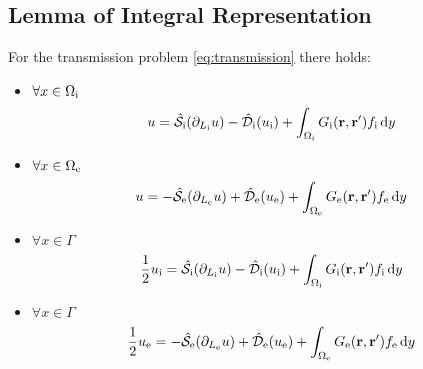 \subsection{Lemma of Integral Representation}
For the transmission problem \ref{eq:transmission} there holds:
\begin{itemize}
\item $\forall x \in \Omegai$
\begin{equation}
u = \bi{S}_\mathrm{i}(\partiali u)
- \bi{D}_\mathrm{i}(\ui) + \int_{\Omegai} \Gi f_\mathrm{i}\diff y
\end{equation}
\item $\forall x \in \Omegae$
\begin{equation}
u = -\bi{S}_\mathrm{e}(\partiale u)
+ \bi{D}_\mathrm{e}(\ue) + \int_{\Omegae}\Ge f_\mathrm{e}\diff y
\end{equation}
\item $\forall x \in \Gamma$
  \begin{equation}\label{eq:stat3}
    \frac{1}{2}\ui = \bi{S}_\mathrm{i}(\partiali u)
    - \bi{D}_\mathrm{i}(\ui) + \int_{\Omegai}\Gi f_\mathrm{i}\diff y
  \end{equation}
\item $\forall x \in \Gamma$
  \begin{equation}\label{eq:stat4}
    \frac{1}{2}\ue = -\bi{S}_\mathrm{e}(\partiale u)
    + \bi{D}_\mathrm{e}(\ue) + \int_{\Omegae}\Ge f_\mathrm{e}\diff y
  \end{equation}
\end{itemize}

